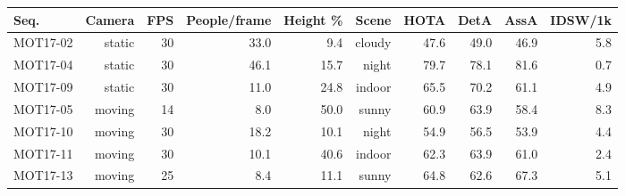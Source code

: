 \begin{tabular}{lrrrrrrrrr}
\toprule
Seq. & Camera & FPS & People/frame & Height \% & Scene & HOTA & DetA & AssA & IDSW/1k \\
\midrule
MOT17-02 & static & 30 & 33.0 & 9.4 & cloudy & 47.6 & 49.0 & 46.9 & 5.8 \\
MOT17-04 & static & 30 & 46.1 & 15.7 & night & 79.7 & 78.1 & 81.6 & 0.7 \\
MOT17-09 & static & 30 & 11.0 & 24.8 & indoor & 65.5 & 70.2 & 61.1 & 4.9 \\
MOT17-05 & moving & 14 & 8.0 & 50.0 & sunny & 60.9 & 63.9 & 58.4 & 8.3 \\
MOT17-10 & moving & 30 & 18.2 & 10.1 & night & 54.9 & 56.5 & 53.9 & 4.4 \\
MOT17-11 & moving & 30 & 10.1 & 40.6 & indoor & 62.3 & 63.9 & 61.0 & 2.4 \\
MOT17-13 & moving & 25 & 8.4 & 11.1 & sunny & 64.8 & 62.6 & 67.3 & 5.1 \\
\bottomrule
\end{tabular}
